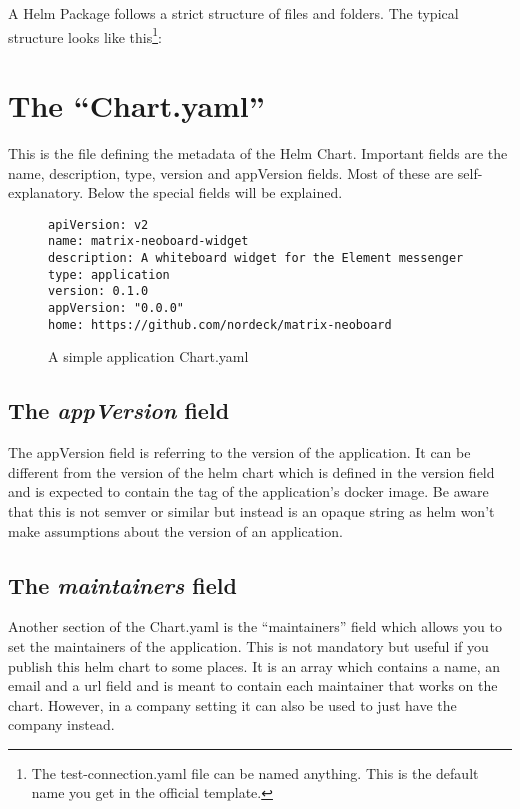 A Helm Package follows a strict structure of files and folders.
The typical structure looks like this\footnote{The test-connection.yaml file can be named anything.
	This is the default name you get in the official template.}:

\section{The \enquote{Chart.yaml}}
This is the file defining the metadata of the Helm Chart.
Important fields are the name, description, type, version and appVersion fields.
Most of these are self-explanatory.
Below the special fields will be explained.

\begin{figure}[h]
\begin{verbatim}
apiVersion: v2
name: matrix-neoboard-widget
description: A whiteboard widget for the Element messenger
type: application
version: 0.1.0
appVersion: "0.0.0"
home: https://github.com/nordeck/matrix-neoboard
\end{verbatim}
\caption{A simple application Chart.yaml}\label{code:Chart.yaml}
\end{figure}

\subsection{The \emph{appVersion} field}
The appVersion field is referring to the version of the application.
It can be different from the version of the helm chart which is defined in the version field and is expected to contain the tag of the application's docker image.
Be aware that this is not semver or similar but instead is an opaque string as helm won't make assumptions about the version of an application.
\subsection{The \emph{maintainers} field}
Another section of the Chart.yaml is the \enquote{maintainers} field which allows you to set the maintainers of the application.
This is not mandatory but useful if you publish this helm chart to some places.
It is an array which contains a name, an email and a url field and is meant to contain each maintainer that works on the chart.
However, in a company setting it can also be used to just have the company instead.

